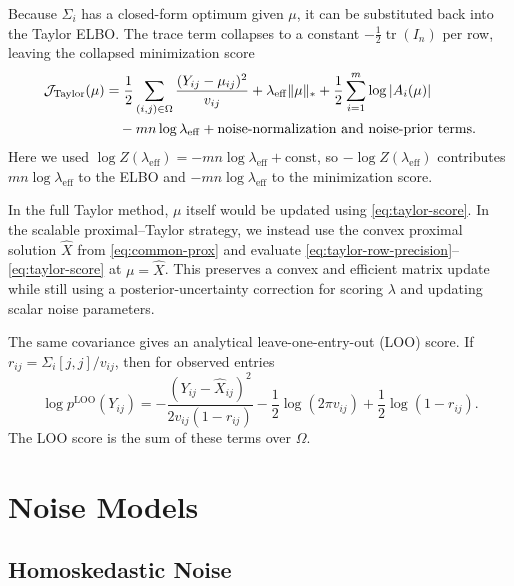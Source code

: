 \documentclass[11pt]{article}
\begin{document}
Because $\Sigma_i$ has a closed-form optimum given $\mu$, it can be substituted
back into the Taylor ELBO.  The trace term collapses to a constant
$-\frac{1}{2}\operatorname{tr}(I_n)$ per row, leaving the collapsed minimization
score
\begin{align}
    \mathcal{J}_{\mathrm{Taylor}}(\mu)
    &=
    \frac{1}{2}
    \sum_{(i,j)\in\Omega}
    \frac{(Y_{ij}-\mu_{ij})^2}{v_{ij}}
    +
    \lambda_{\mathrm{eff}}\|\mu\|_*
    +
    \frac{1}{2}\sum_{i=1}^m \log |A_i(\mu)| \notag\\
    &\quad
    -
    mn\log\lambda_{\mathrm{eff}}
    +
    \text{noise-normalization and noise-prior terms}.
    \label{eq:taylor-score}
\end{align}
Here we used $\log Z(\lambda_{\mathrm{eff}})=-mn\log\lambda_{\mathrm{eff}}+
\mathrm{const}$, so $-\log Z(\lambda_{\mathrm{eff}})$ contributes
$mn\log\lambda_{\mathrm{eff}}$ to the ELBO and
$-mn\log\lambda_{\mathrm{eff}}$ to the minimization score.

In the full Taylor method, $\mu$ itself would be updated using
\eqref{eq:taylor-score}.  In the scalable proximal--Taylor strategy, we instead
use the convex proximal solution $\hat X$ from \eqref{eq:common-prox} and
evaluate \eqref{eq:taylor-row-precision}--\eqref{eq:taylor-score} at
$\mu=\hat X$.  This preserves a convex and efficient matrix update while still
using a posterior-uncertainty correction for scoring $\lambda$ and updating
scalar noise parameters.

The same covariance gives an analytical leave-one-entry-out (LOO) score.  If
$r_{ij}=\Sigma_i[j,j]/v_{ij}$, then for observed entries
\begin{equation}
    \log p^{\mathrm{LOO}}(Y_{ij})
    =
    -\frac{(Y_{ij}-\hat X_{ij})^2}{2v_{ij}(1-r_{ij})}
    -\frac{1}{2}\log(2\pi v_{ij})
    +\frac{1}{2}\log(1-r_{ij}).
\end{equation}
The LOO score is the sum of these terms over $\Omega$.

\section{Noise Models}

\subsection{Homoskedastic Noise}
\end{document}
